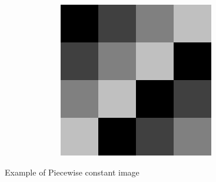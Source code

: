 \documentclass{beamer}
\begin{document}
\begin{frame}[t]
\begin{figure}
\begin{columns}[onlytextwidth]
\begin{column}{0.45\textwidth}
                \label{fig:sub1}
            \end{column}
            \begin{column}{0.45\textwidth}
                \centering
                \includegraphics[width=.8\linewidth, scale=0.2]{img/2.png}
                \label{fig:sub2}
            \end{column}
        \end{columns}
        
        \label{fig:images}
        \caption{Example of Piecewise constant image}
    \end{figure}  
\end{frame}
\end{document}
